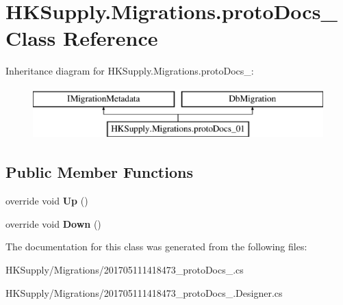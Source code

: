 \hypertarget{class_h_k_supply_1_1_migrations_1_1proto_docs__01}{}\section{H\+K\+Supply.\+Migrations.\+proto\+Docs\+\_ Class Reference}
\label{class_h_k_supply_1_1_migrations_1_1proto_docs__01}
Inheritance diagram for H\+K\+Supply.\+Migrations.\+proto\+Docs\+\_\+:\begin{figure}[H]
\begin{center}
\leavevmode
\includegraphics[height=2.000000cm]{class_h_k_supply_1_1_migrations_1_1proto_docs__01}
\end{center}
\end{figure}
\subsection*{Public Member Functions}
\begin{DoxyCompactItemize}
\item 
\mbox{\label{class_h_k_supply_1_1_migrations_1_1proto_docs__01_a1dce286702757c3e030c5d1898fe880a}} 
override void {\bfseries Up} ()
\item 
\mbox{\label{class_h_k_supply_1_1_migrations_1_1proto_docs__01_a342b0fb2d5427d632d73c9a78dc25537}} 
override void {\bfseries Down} ()
\end{DoxyCompactItemize}


The documentation for this class was generated from the following files\+:\begin{DoxyCompactItemize}
\item 
H\+K\+Supply/\+Migrations/201705111418473\+\_\+proto\+Docs\+\_.\+cs\item 
H\+K\+Supply/\+Migrations/201705111418473\+\_\+proto\+Docs\+\_.\+Designer.\+cs\end{DoxyCompactItemize}
